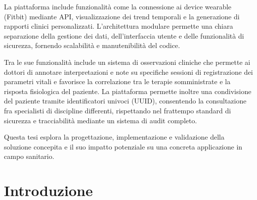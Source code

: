 \documentclass[12pt,a4paper,oneside]{report}
\begin{document}
La piattaforma include funzionalità come la connessione ai device wearable (Fitbit) mediante API, visualizzazione dei trend temporali e la generazione di rapporti clinici personalizzati. L'architettura modulare permette una chiara separazione della gestione dei dati, dell'interfaccia utente e delle funzionalità di sicurezza, fornendo scalabilità e manutenibilità del codice.

Tra le sue funzionalità include un sistema di osservazioni cliniche che permette ai dottori di annotare interpretazioni e note su specifiche sessioni di registrazione dei parametri vitali e favorisce la correlazione tra le terapie somministrate e la risposta fisiologica del paziente. La piattaforma permette inoltre una condivisione del paziente tramite identificatori univoci (UUID), consentendo la consultazione fra specialisti di discipline differenti, rispettando nel frattempo standard di sicurezza e tracciabilità mediante un sistema di audit completo.

Questa tesi esplora la progettazione, implementazione e validazione della soluzione concepita e il suo impatto potenziale su una concreta applicazione in campo sanitario.

\newpage

\tableofcontents
\newpage

\listoffigures
\newpage

\pagestyle{fancy}  %


\chapter{Introduzione}
\end{document}
